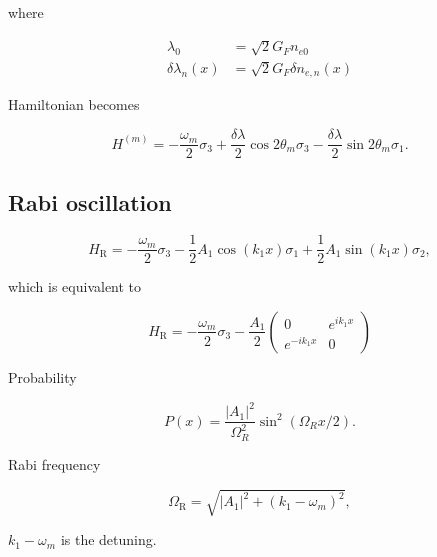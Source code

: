 \documentclass[%
preprint,
 amsmath,amssymb,
 aps,
]{revtex4-1}
\begin{document}
where

\begin{align}
    \lambda_0 &= \sqrt{2}G_F n_{e0} \\
    \delta \lambda_n(x) &= \sqrt{2}G_F \delta n_{e,n}(x)
\end{align}


Hamiltonian becomes

\begin{equation}
    H^{(m)} = - \frac{\omega_m}{2} \sigma_3 + \frac{\delta \lambda}{2} \cos 2\theta_m \sigma_3 - \frac{\delta \lambda}{2} \sin 2 \theta_m \sigma_1.
\end{equation}







\subsection{Rabi oscillation}

\begin{equation}
H_{\mathrm R} = -\frac{\omega_m}{2} \sigma_3 - \frac{1}{2}A_1 \cos(k_1 x) \sigma_1 + \frac{1}{2} A_1 \sin(k_1 x) \sigma_2,
\end{equation}

which is equivalent to

\begin{equation}
H_{\mathrm R} = -\frac{\omega_m}{2} \sigma_3 - \frac{A_1}{2} \begin{pmatrix}0 & e^{i k_1 x} \\ e^{-i k_1 x} & 0 \end{pmatrix} 
\end{equation}


Probability

\begin{equation}
P(x) = \frac{\lvert A_1 \rvert^2}{ \Omega_R^2 }  \sin^2 \left( \Omega_R x/2 \right).
\end{equation}

Rabi frequency

\begin{equation}
\Omega_{\mathrm R} = \sqrt{ \lvert A_1 \rvert^2 + (k_1 - \omega_m)^2 },
\end{equation}

$k_1 - \omega_m$ is the detuning.
\end{document}
